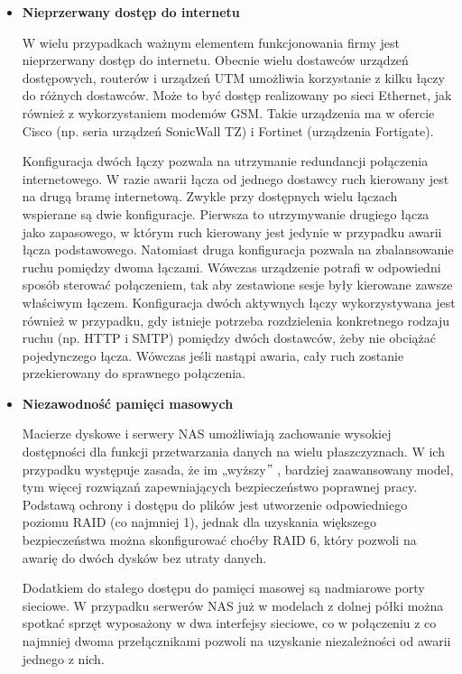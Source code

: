 \documentclass[12pt]{article}
\renewcommand{\_}{\kern-1.5pt\textunderscore\kern-1.5pt}
\begin{document}
\begin{itemize}
	\item \textbf{Nieprzerwany dostęp do internetu}\par

W wielu przypadkach ważnym elementem funkcjonowania firmy jest nieprzerwany dostęp do internetu. Obecnie wielu dostawców urządzeń dostępowych, routerów i urządzeń UTM umożliwia korzystanie z kilku łączy do różnych dostawców. Może to być dostęp realizowany po sieci Ethernet, jak również z wykorzystaniem modemów GSM. Takie urządzenia ma w ofercie Cisco (np. seria urządzeń SonicWall TZ) i Fortinet (urządzenia Fortigate).\par


\vspace{\baselineskip}
Konfiguracja dwóch łączy pozwala na utrzymanie redundancji połączenia internetowego. W razie awarii łącza od jednego dostawcy ruch kierowany jest na drugą bramę internetową. Zwykle przy dostępnych wielu łączach wspierane są dwie konfiguracje. Pierwsza to utrzymywanie drugiego łącza jako zapasowego, w którym ruch kierowany jest jedynie w przypadku awarii łącza podstawowego. Natomiast druga konfiguracja pozwala na zbalansowanie ruchu pomiędzy dwoma łączami. Wówczas urządzenie potrafi w odpowiedni sposób sterować połączeniem, tak aby zestawione sesje były kierowane zawsze właściwym łączem. Konfiguracja dwóch aktywnych łączy wykorzystywana jest również w przypadku, gdy istnieje potrzeba rozdzielenia konkretnego rodzaju ruchu (np. HTTP i SMTP) pomiędzy dwóch dostawców, żeby nie obciążać pojedynczego łącza. Wówczas jeśli nastąpi awaria, cały ruch zostanie przekierowany do sprawnego połączenia.\par

	\item \textbf{Niezawodność pamięci masowych}\par

Macierze dyskowe i serwery NAS umożliwiają zachowanie wysokiej dostępności dla funkcji przetwarzania danych na wielu płaszczyznach. W ich przypadku występuje zasada, że im „wyższy$"$ , bardziej zaawansowany model, tym więcej rozwiązań zapewniających bezpieczeństwo poprawnej pracy. Podstawą ochrony i dostępu do plików jest utworzenie odpowiedniego poziomu RAID (co najmniej 1), jednak dla uzyskania większego bezpieczeństwa można skonfigurować choćby RAID 6, który pozwoli na awarię do dwóch dysków bez utraty danych.\par


\vspace{\baselineskip}
Dodatkiem do stałego dostępu do pamięci masowej są nadmiarowe porty sieciowe. W przypadku serwerów NAS już w modelach z dolnej półki można spotkać sprzęt wyposażony w dwa interfejsy sieciowe, co w połączeniu z co najmniej dwoma przełącznikami pozwoli na uzyskanie niezależności od awarii jednego z nich.\par



\end{itemize}
\end{document}
